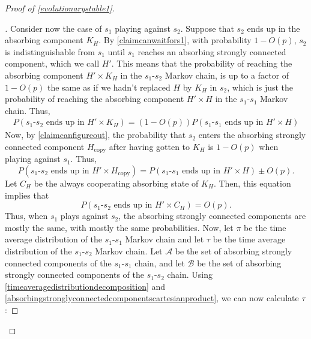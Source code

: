\documentclass[11pt]{amsart}
\theoremstyle{definition}
\theoremstyle{remark}
\newenvironment{subproof}[1][\proofname]{%
  \renewcommand{\qedsymbol}{$\blacksquare$}%
  \begin{proof}[#1]%
}{%
  \end{proof}%
}
\begin{document}
\begin{proof}[Proof of \cref{evolutionarystable1}]
\begin{subproof}
        Consider now the case of $s_1$ playing against $s_2$. Suppose that $s_2$ ends up in the absorbing component $K_H$. By \cref{claimcanwaitfors1}, with probability $1 - O(p)$, $s_2$ is indistinguishable from $s_1$ until $s_1$ reaches an absorbing strongly connected component, which we call $H'$.         
        This means that the probability of reaching the absorbing component $H' \times K_H$ in the $s_1$-$s_2$ Markov chain, is up to a factor of $1 - O(p)$ the same as if we hadn't replaced $H$ by $K_H$ in $s_2$, which is just the probability of reaching the absorbing component $H' \times H$ in the $s_1$-$s_1$ Markov chain. Thus, 
        \begin{multline*}
          P(\text{$s_1$-$s_2$ ends up in $H' \times K_H$}) = (1 - O(p)) P(\text{$s_1$-$s_1$ ends up in $H' \times H$})
        \end{multline*}
        Now, by \cref{claimcanfigureout}, the probability that $s_2$ enters the absorbing strongly connected component $H_\text{copy}$ after having gotten to $K_H$ is $1 - O(p)$ when playing against $s_1$. Thus,
        \begin{equation}
          \label{equationhhcopy}
          P(\text{$s_1$-$s_2$ ends up in $H' \times H_\text{copy}$}) = P(\text{$s_1$-$s_1$ ends up in $H' \times H$}) \pm O(p).
        \end{equation}
        Let $C_H$ be the always cooperating absorbing state of $K_H$. Then, this equation implies that 
        \begin{equation}
          \label{equationhch}
          P(\text{$s_1$-$s_2$ ends up in $H' \times C_H$}) = O(p).
        \end{equation}
        Thus, when $s_1$ plays against $s_2$, the absorbing strongly connected components are mostly the same, with mostly the same probabilities. 
        Now, let $\pi$ be the time average distribution of the $s_1$-$s_1$ Markov chain and let $\tau$ be the time average distribution of the $s_1$-$s_2$ Markov chain. Let $\mathcal{A}$ be the set of absorbing strongly connected components of the $s_1$-$s_1$ chain, and let $\mathcal{B}$ be the set of absorbing strongly connected components of the $s_1$-$s_2$ chain. Using \cref{timeaveragedistributiondecomposition} and \cref{absorbingstronglyconnectedcomponentscartesianproduct}, we can now calculate $\tau$:


\end{subproof}
\end{proof}
\end{document}
